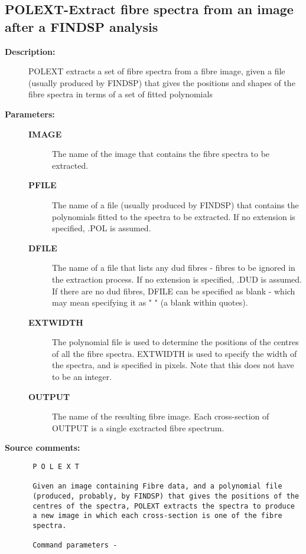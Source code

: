\subsection{POLEXT-\label{POLEXT}Extract fibre spectra from an image after a FINDSP analysis}
\begin{description}

\item [{\bf Description:}]
 POLEXT extracts a set of fibre spectra from a fibre image, given
 a file (usually produced by FINDSP) that gives the positions and
 shapes of the fibre spectra in terms of a set of fitted polynomials

\item [{\bf Parameters:}]
\begin{description}
\item [{\bf IMAGE}]
 The name of the image that contains the fibre
 spectra to be extracted.
\item [{\bf PFILE}]
 The name of a file (usually produced by
 FINDSP) that contains the polynomials fitted to the
 spectra to be extracted.  If no extension is specified,
 .POL is assumed.
\item [{\bf DFILE}]
 The name of a file that lists any dud fibres - fibres to
 be ignored in the extraction process.  If no extension is
 specified, .DUD is assumed.  If there are no dud fibres,
 DFILE can be specified as blank - which may mean specifying
 it as " " (a blank within quotes).
\item [{\bf EXTWIDTH}]
 The polynomial file is used to determine the positions of
 the centres of all the fibre spectra.  EXTWIDTH is used to
 specify the width of the spectra, and is specified in
 pixels.  Note that this does not have to be an integer.
\item [{\bf OUTPUT}]
 The name of the resulting fibre image.  Each
 cross-section of OUTPUT is a single exctracted fibre
 spectrum.
\end{description}

\item [{\bf Source comments:}]
\begin{verbatim}
 P O L E X T

 Given an image containing Fibre data, and a polynomial file
 (produced, probably, by FINDSP) that gives the positions of the
 centres of the spectra, POLEXT extracts the spectra to produce
 a new image in which each cross-section is one of the fibre
 spectra.

 Command parameters -


\end{verbatim}
\end{description}
